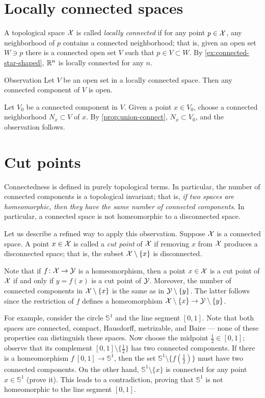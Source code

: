 \section{Locally connected spaces}\label{sec:Locally connected spaces}

A topological space $\mathcal{X}$ is called \emph{locally connected} if for any point $p\in \mathcal{X}$, any neighborhood of $p$ contains a connected neighborhood;
that is, given an open set $W\ni p$ there is a connected open set $V$ such that $p\in V\subset W$.
By \ref{ex:connected-star-shaped}, $\mathbb{R}^n$ is locally connected for any $n$.

\begin{thm}{Observation}\label{obs:open-connected-component}
Let $V$ be an open set in a locally connected space.
Then any connected component of $V$ is open.
\end{thm}

Let $V_0$ be a connected component in $V$.
Given a point $x\in V_0$, choose a connected neighborhood $N_x\subset V$ of $x$.
By \ref{prop:union-connect}, $N_x\subset V_0$, and the observation follows.
\qeds

\section{Cut points}

Connectedness is defined in purely topological terms.
In particular, the number of connected components is a topological invariant;
that is, \textit{if two spaces are homeomorphic, then they have the same number of connected components}.
In particular, a connected space is not homeomorphic to a disconnected space.

Let us describe a refined way to apply this observation.
Suppose $\mathcal{X}$ is a connected space.
A point $x\in\mathcal{X}$ is called a \emph{cut point} of $\mathcal{X}$ if removing $x$ from $\mathcal{X}$ produces a disconnected space;
that is, the subset $\mathcal{X}\setminus\{x\}$ is disconnected.

Note that if $f\colon\mathcal{X}\to \mathcal{Y}$ is a homeomorphism, then a point $x \in\mathcal{X}$ is a cut point of $\mathcal{X}$ if and only if $y=f(x)$ is a cut point of $\mathcal{Y}$.
Moreover, the number of connected components in $\mathcal{X}\setminus\{x\}$ is the same as in $\mathcal{Y}\setminus\{y\}$.
The latter follows since the restriction of $f$ defines a homeomorphism $\mathcal{X}\setminus\{x\}\to \mathcal{Y}\setminus\{y\}$.

For example, consider the circle $\mathbb{S}^1$ and the line segment $[0,1]$.
Note that both spaces are connected, compact, Hausdorff, metrizable, and Baire --- none of these properties can distinguish these spaces.
Now choose the midpoint $\tfrac12\in [0,1]$;
observe that its complement $[0,1]\setminus \{\tfrac12\}$ has two connected components.
If there is a homeomorphism $f\:[0,1]\to \mathbb{S}^1$, then the set $\mathbb{S}^1\setminus \{f(\tfrac12)\}$ must have two connected components.
On the other hand, $\mathbb{S}^1\setminus \{x\}$ is connected for any point $x\in \mathbb{S}^1$ (prove it).
This leads to a contradiction, proving that $\mathbb{S}^1$ is not homeomorphic to the line segment $[0,1]$.

